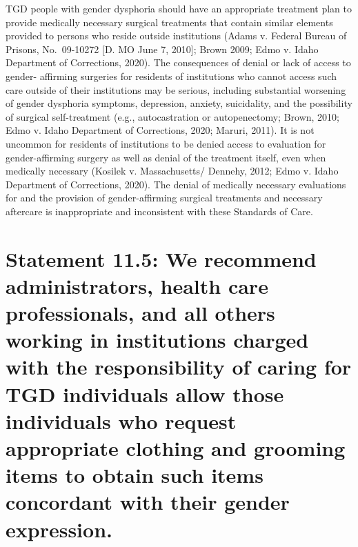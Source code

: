 \documentclass[
]{book}
\begin{document}
TGD people with gender dysphoria should
have an appropriate treatment plan to provide
medically necessary surgical treatments that contain similar elements provided to persons who
reside outside institutions (Adams v. Federal
Bureau of Prisons, No.~09-10272 {[}D. MO June 7,
2010{]}; Brown 2009; Edmo v. Idaho Department
of Corrections, 2020). The consequences of denial
or lack of access to gender- affirming surgeries
for residents of institutions who cannot access
such care outside of their institutions may be
serious, including substantial worsening of gender
dysphoria symptoms, depression, anxiety, suicidality, and the possibility of surgical self-treatment
(e.g., autocastration or autopenectomy; Brown,
2010; Edmo v. Idaho Department of Corrections,
2020; Maruri, 2011). It is not uncommon for
residents of institutions to be denied access to
evaluation for gender-affirming surgery as well
as denial of the treatment itself, even when medically necessary (Kosilek v. Massachusetts/
Dennehy, 2012; Edmo v. Idaho Department of
Corrections, 2020). The denial of medically necessary evaluations for and the provision of
gender-affirming surgical treatments and necessary aftercare is inappropriate and inconsistent
with these Standards of Care.

\hypertarget{statement-11.5-we-recommend-administrators-health-care-professionals-and-all-others-working-in-institutions-charged-with-the-responsibility-of-caring-for-tgd-individuals-allow-those-individuals-who-request-appropriate-clothing-and-grooming-items-to-obtain-such-items-concordant-with-their-gender-expression.}{%
\section*{Statement 11.5: We recommend administrators, health care professionals, and all others working in institutions charged with the responsibility of caring for TGD individuals allow those individuals who request appropriate clothing and grooming items to obtain such items concordant with their gender expression.}\label{statement-11.5-we-recommend-administrators-health-care-professionals-and-all-others-working-in-institutions-charged-with-the-responsibility-of-caring-for-tgd-individuals-allow-those-individuals-who-request-appropriate-clothing-and-grooming-items-to-obtain-such-items-concordant-with-their-gender-expression.}}
\end{document}
